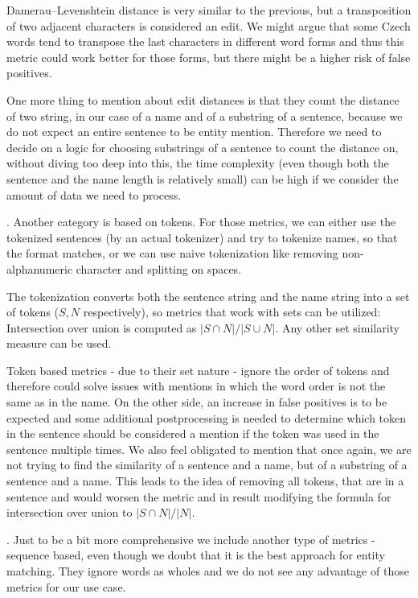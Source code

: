 Damerau–Levenshtein distance is very similar to the previous, but a transposition of two adjacent characters is considered an edit. We might argue that some Czech words tend to transpose the last characters in different word forms and thus this metric could work better for those forms, but there might be a higher risk of false positives.

One more thing to mention about edit distances is that they count the distance of two string, in our case of a name and of a substring of a sentence, because we do not expect an entire sentence to be entity mention. Therefore we need to decide on a logic for choosing substrings of a sentence to count the distance on, without diving too deep into this, the time complexity (even though both the sentence and the name length is relatively small) can be high if we consider the amount of data we need to process. 

. Another category is based on tokens. For those metrics, we can either use the tokenized sentences (by an actual tokenizer) and try to tokenize names, so that the format matches, or we can use naive tokenization like removing non-alphanumeric character and splitting on spaces.

The tokenization converts both the sentence string and the name string into a set of tokens ($S, N$ respectively), so metrics that work with sets can be utilized: Intersection over union is computed as $|S \cap N| / |S \cup N|$. Any other set similarity measure can be used. 

Token based metrics - due to their set nature - ignore the order of tokens and therefore could solve issues with mentions in which the word order is not the same as in the name. On the other side, an increase in false positives is to be expected and some additional postprocessing is needed to determine which token in the sentence should be considered a mention if the token was used in the sentence multiple times. We also feel obligated to mention that once again, we are not trying to find the similarity of a sentence and a name, but of a substring of a sentence and a name. This leads to the idea of removing all tokens, that are in a sentence and would worsen the metric and in result modifying the formula for intersection over union to  $|S \cap N| / |N|$.


. Just to be a bit more comprehensive we include another type of metrics - sequence based, even though we doubt that it is the best approach for entity matching. They ignore words as wholes and we do not see any advantage of those metrics for our use case. 

